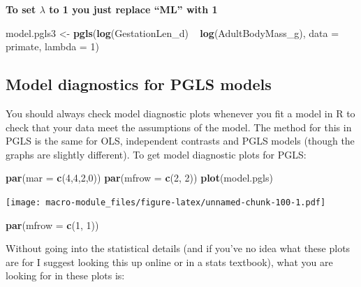\documentclass[]{book}
\newenvironment{Shaded}{\begin{snugshade}}{\end{snugshade}}
\newcommand{\KeywordTok}[1]{\textcolor[rgb]{0.13,0.29,0.53}{\textbf{{#1}}}}
\newcommand{\DataTypeTok}[1]{\textcolor[rgb]{0.13,0.29,0.53}{{#1}}}
\newcommand{\DecValTok}[1]{\textcolor[rgb]{0.00,0.00,0.81}{{#1}}}
\newcommand{\StringTok}[1]{\textcolor[rgb]{0.31,0.60,0.02}{{#1}}}
\newcommand{\NormalTok}[1]{{#1}}
\begin{document}
\textbf{To set \(\lambda\) to 1 you just replace ``ML'' with 1}

\begin{Shaded}
\begin{Highlighting}[]
\NormalTok{model.pgls3 <-}\StringTok{ }\KeywordTok{pgls}\NormalTok{(}\KeywordTok{log}\NormalTok{(GestationLen_d) ~}\StringTok{ }\KeywordTok{log}\NormalTok{(AdultBodyMass_g), }
                    \DataTypeTok{data =} \NormalTok{primate, }\DataTypeTok{lambda =} \DecValTok{1}\NormalTok{)}
\end{Highlighting}
\end{Shaded}

\subsection{Model diagnostics for PGLS
models}\label{model-diagnostics-for-pgls-models}

You should always check model diagnostic plots whenever you fit a model
in R to check that your data meet the assumptions of the model. The
method for this in PGLS is the same for OLS, independent contrasts and
PGLS models (though the graphs are slightly different). To get model
diagnostic plots for PGLS:

\begin{Shaded}
\begin{Highlighting}[]
\KeywordTok{par}\NormalTok{(}\DataTypeTok{mar =} \KeywordTok{c}\NormalTok{(}\DecValTok{4}\NormalTok{,}\DecValTok{4}\NormalTok{,}\DecValTok{2}\NormalTok{,}\DecValTok{0}\NormalTok{))}
\KeywordTok{par}\NormalTok{(}\DataTypeTok{mfrow =} \KeywordTok{c}\NormalTok{(}\DecValTok{2}\NormalTok{, }\DecValTok{2}\NormalTok{))}
\KeywordTok{plot}\NormalTok{(model.pgls)}
\end{Highlighting}
\end{Shaded}

\texttt{[image: macro-module\_files/figure-latex/unnamed-chunk-100-1.pdf]}

\begin{Shaded}
\begin{Highlighting}[]
\KeywordTok{par}\NormalTok{(}\DataTypeTok{mfrow =} \KeywordTok{c}\NormalTok{(}\DecValTok{1}\NormalTok{, }\DecValTok{1}\NormalTok{))}
\end{Highlighting}
\end{Shaded}

Without going into the statistical details (and if you've no idea what
these plots are for I suggest looking this up online or in a stats
textbook), what you are looking for in these plots is:
\end{document}
